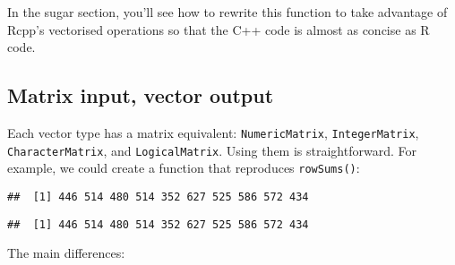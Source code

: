 In the sugar section, you'll see how to rewrite this function to take
advantage of Rcpp's vectorised operations so that the C++ code is almost
as concise as R code.

\hypertarget{matrix-input-vector-output}{%
\subsection{Matrix input, vector
output}\label{matrix-input-vector-output}}

Each vector type has a matrix equivalent: \texttt{NumericMatrix},
\texttt{IntegerMatrix}, \texttt{CharacterMatrix}, and
\texttt{LogicalMatrix}. Using them is straightforward. For example, we
could create a function that reproduces \texttt{rowSums()}:

\begin{Shaded}
\begin{Highlighting}[]
\NormalTok{(}

\StringTok{    \}}
\StringTok{  \}}
\NormalTok{)}
\NormalTok{(}\NormalTok{)}
\StringTok{ }\NormalTok{(}\NormalTok{(}\NormalTok{), }\NormalTok{)}
\end{Highlighting}
\end{Shaded}

\begin{verbatim}
##  [1] 446 514 480 514 352 627 525 586 572 434
\end{verbatim}

\begin{Shaded}
\begin{Highlighting}[]
\end{Highlighting}
\end{Shaded}

\begin{verbatim}
##  [1] 446 514 480 514 352 627 525 586 572 434
\end{verbatim}

The main differences:

